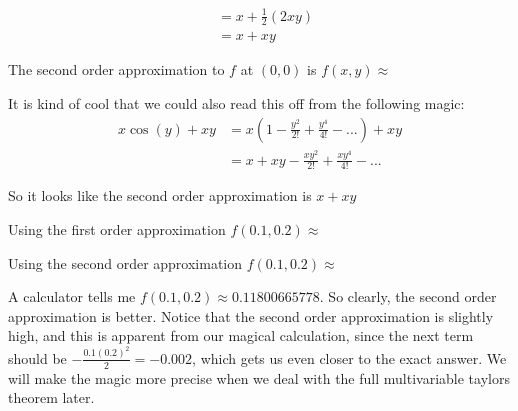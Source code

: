 \documentclass{ximera}
\begin{document}
\begin{question}
\begin{solution}
\begin{hint}
\begin{align*}
					&=x+\frac{1}{2} (2xy)\\
					&=x+xy
					\end{align*}
			\end{hint}
			The second order approximation to $f$ at $(0,0)$ is $f(x,y) \approx$ 
		\end{solution}
		
		It is kind of cool that we could also read this off from the following magic:
			\begin{align*}
				x\cos(y)+xy &= x(1-\frac{y^2}{2!}+\frac{y^4}{4!}-...)+xy\\	
						&=x+xy-\frac{xy^2}{2!}+\frac{xy^4}{4!}-...
			\end{align*}
		
		So it looks like the second order approximation is $x+xy$
		\begin{solution}
			Using the first order approximation $f(0.1,0.2) \approx$ 
		\end{solution}
		\begin{solution}
			Using the second order approximation $f(0.1,0.2) \approx$ \answer{$0.12$}
		\end{solution}
		
		A calculator tells me $f(0.1,0.2) \approx 0.11800665778$.  So clearly, the second order approximation is better.  Notice that the second order approximation is slightly
		high, and this is apparent from our magical calculation, since the next term should be $-\frac{0.1(0.2)^2}{2}  = -0.002$, which gets us even closer to the exact answer.  We will make the 
		magic more precise when we deal with the full multivariable taylors theorem later.
	\end{question}
	
\end{document}
